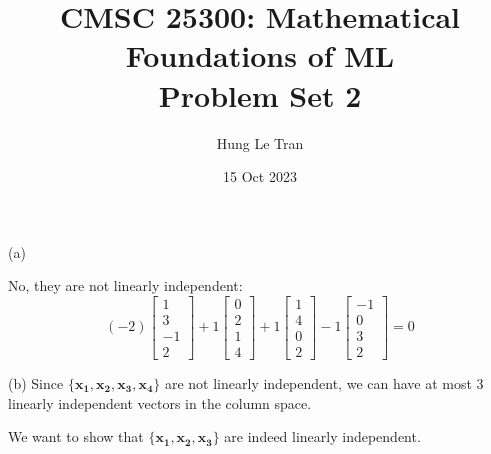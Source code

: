 \documentclass[a4paper, 12pt]{article}
\title{CMSC 25300: Mathematical Foundations of ML \\ \large Problem Set 2}
\date{15 Oct 2023}
\author{Hung Le Tran}
\begin{document}
\maketitle
\setcounter{section}{2}
\begin{problem} [Problem 1]
\end{problem}
\begin{solution}
    (a)

    No, they are not linearly independent:
    \[
    (-2) \begin{bmatrix}
        1 \\ 3 \\ -1 \\ 2
    \end{bmatrix} + 1 \begin{bmatrix}
        0 \\ 2 \\ 1 \\ 4
    \end{bmatrix} + 1 \begin{bmatrix}
        1 \\ 4  \\ 0 \\ 2
    \end{bmatrix} - 1 \begin{bmatrix}
    -1 \\ 0 \\ 3 \\ 2
    \end{bmatrix} = 0
    \]

    (b)
    Since $\{\mathbf{x_1, x_2, x_3, x_4}\}$ are not linearly independent, we can have at most 3 linearly independent vectors in the column space.

    We want to show that $\{\mathbf{x_1, x_2, x_3}\}$ are indeed linearly independent.


\end{solution}
\end{document}
